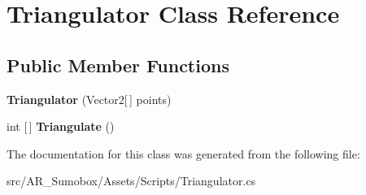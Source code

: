 \hypertarget{class_triangulator}{}\section{Triangulator Class Reference}
\label{class_triangulator}
\subsection*{Public Member Functions}
\begin{DoxyCompactItemize}
\item 
\mbox{\label{class_triangulator_ac8b7c647942722515ef899f4a36a0b19}} 
{\bfseries Triangulator} (Vector2\mbox{[}$\,$\mbox{]} points)
\item 
\mbox{\label{class_triangulator_ac7f1cdff8f4aecc3990ca8dd7bdf5ddb}} 
int \mbox{[}$\,$\mbox{]} {\bfseries Triangulate} ()
\end{DoxyCompactItemize}


The documentation for this class was generated from the following file\+:\begin{DoxyCompactItemize}
\item 
src/\+A\+R\+\_\+\+Sumobox/\+Assets/\+Scripts/Triangulator.\+cs\end{DoxyCompactItemize}
